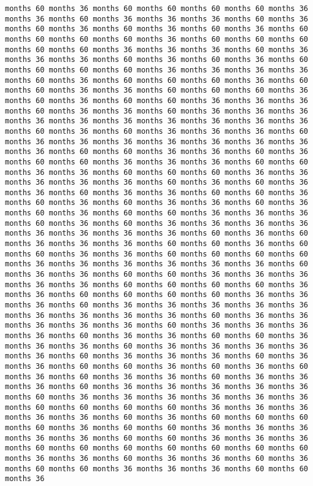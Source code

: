 \documentclass[11pt]{article}
\begin{document}
\begin{Verbatim}[commandchars=\\\{\}, frame=single, framerule=2mm, rulecolor=\color{outerrorbackground}]
months 60 months 36 months 60 months 60 months 60 months 60 months 36 months 36 months 60 months 36 months 36 months 36 months 60 months 36 months 60 months 36 months 60 months 36 months 60 months 36 months 60 months 60 months 60 months 60 months 36 months 60 months 60 months 60 months 60 months 60 months 36 months 36 months 36 months 60 months 36 months 36 months 36 months 60 months 36 months 60 months 36 months 60 months 60 months 60 months 60 months 36 months 36 months 36 months 36 months 60 months 36 months 60 months 60 months 60 months 36 months 60 months 60 months 36 months 36 months 60 months 60 months 60 months 36 months 60 months 36 months 60 months 60 months 36 months 36 months 36 months 60 months 36 months 36 months 60 months 36 months 36 months 36 months 36 months 36 months 36 months 36 months 36 months 36 months 36 months 60 months 36 months 60 months 36 months 36 months 36 months 60 months 36 months 36 months 36 months 36 months 36 months 36 months 36 months 36 months 60 months 60 months 36 months 36 months 60 months 36 months 60 months 60 months 36 months 36 months 36 months 60 months 60 months 36 months 36 months 60 months 60 months 60 months 36 months 36 months 36 months 36 months 36 months 60 months 36 months 60 months 36 months 36 months 60 months 36 months 36 months 60 months 60 months 36 months 60 months 36 months 60 months 36 months 36 months 60 months 36 months 60 months 36 months 60 months 60 months 36 months 36 months 36 months 60 months 36 months 60 months 36 months 36 months 36 months 36 months 36 months 36 months 36 months 36 months 60 months 36 months 60 months 36 months 36 months 36 months 60 months 60 months 36 months 60 months 60 months 36 months 36 months 60 months 60 months 60 months 60 months 36 months 36 months 36 months 36 months 36 months 36 months 60 months 36 months 36 months 60 months 60 months 36 months 36 months 36 months 36 months 36 months 60 months 60 months 60 months 60 months 36 months 36 months 60 months 60 months 60 months 60 months 36 months 36 months 36 months 60 months 36 months 36 months 36 months 36 months 36 months 36 months 36 months 36 months 36 months 60 months 36 months 36 months 36 months 36 months 36 months 60 months 36 months 36 months 36 months 36 months 60 months 36 months 36 months 60 months 60 months 36 months 36 months 36 months 60 months 36 months 36 months 36 months 36 months 36 months 60 months 36 months 36 months 36 months 60 months 36 months 36 months 60 months 60 months 36 months 60 months 36 months 60 months 36 months 60 months 36 months 36 months 60 months 36 months 36 months 36 months 60 months 36 months 36 months 36 months 36 months 36 months 60 months 36 months 36 months 36 months 36 months 36 months 36 months 60 months 60 months 60 months 60 months 36 months 36 months 36 months 36 months 36 months 60 months 36 months 60 months 60 months 60 months 60 months 36 months 60 months 60 months 36 months 36 months 36 months 36 months 36 months 60 months 60 months 36 months 36 months 36 months 60 months 60 months 60 months 60 months 60 months 60 months 60 months 36 months 36 months 60 months 36 months 36 months 60 months 36 months 60 months 60 months 36 months 36 months 36 months 60 months 60 months 36 
\end{Verbatim}
\end{document}
